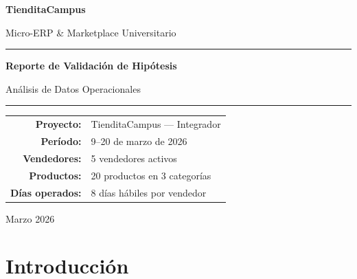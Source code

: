 \documentclass[12pt,letterpaper]{article}
\begin{document}
\begin{titlepage}
    \centering
    \vspace*{2cm}

    {\Huge\bfseries\textcolor{primary}{TienditaCampus}\par}
    \vspace{0.5cm}
    {\Large\textcolor{accent}{Micro-ERP \& Marketplace Universitario}\par}

    \vspace{2cm}

    \rule{\textwidth}{1.5pt}
    \vspace{0.5cm}
    {\LARGE\bfseries Reporte de Validación de Hipótesis\par}
    \vspace{0.3cm}
    {\large Análisis de Datos Operacionales\par}
    \vspace{0.5cm}
    \rule{\textwidth}{1.5pt}

    \vspace{3cm}

    {\large
    \begin{tabular}{rl}
        \textbf{Proyecto:}     & TienditaCampus --- Integrador \\
        \textbf{Período:}      & 9--20 de marzo de 2026 \\
        \textbf{Vendedores:}   & 5 vendedores activos \\
        \textbf{Productos:}    & 20 productos en 3 categorías \\
        \textbf{Días operados:}& 8 días hábiles por vendedor \\
    \end{tabular}
    \par}

    \vfill

    {\large Marzo 2026\par}
\end{titlepage}

\tableofcontents
\newpage

\section{Introducción}
\end{document}
